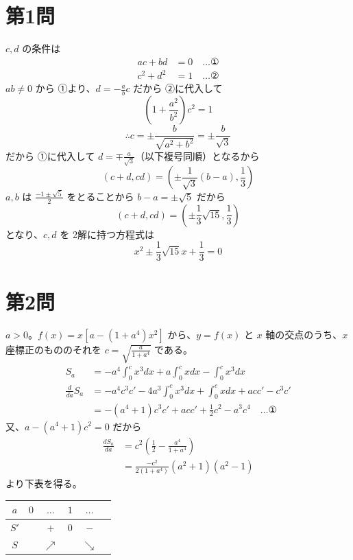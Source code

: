 \documentclass[../main.tex]{subfiles}
\begin{document}
\section*{第1問}

\noindent
[\textbf{解}] $c, d$ の条件は
\begin{align}
  ac + bd &= 0 \quad \dots \text{①} \\
  c^2 + d^2 &= 1 \quad \dots \text{②}
\end{align}
$ab \neq 0$ から ①より、$d = -\frac{a}{b}c$ だから ②に代入して
\[
  \left( 1 + \frac{a^2}{b^2} \right) c^2 = 1
\]
\[
  \therefore c = \pm \frac{b}{\sqrt{a^2+b^2}} = \pm \frac{b}{\sqrt{3}}
\]
だから ①に代入して $d = \mp \frac{a}{\sqrt{3}}$（以下複号同順）となるから
\[
  (c+d, cd) = \left( \pm \frac{1}{\sqrt{3}}(b-a), \frac{1}{3} \right)
\]
$a, b$ は $\frac{-1 \pm \sqrt{5}}{2}$ をとることから $b-a = \pm \sqrt{5}$ だから
\[
  (c+d, cd) = \left( \pm \frac{1}{3}\sqrt{15}, \frac{1}{3} \right)
\]
となり、$c, d$ を 2解に持つ方程式は
\[
  x^2 \pm \frac{1}{3}\sqrt{15}x + \frac{1}{3} = 0
\]

\newpage

\section*{第2問}

\noindent
[\textbf{解}] $a > 0$。$f(x) = x[a - (1+a^4)x^2]$ から、$y = f(x)$ と $x$ 軸の交点のうち、$x$ 座標正のもののそれを $c = \sqrt{\frac{a}{1+a^4}}$ である。
\begin{align*}
  S_a &= -a^4 \int_0^c x^3 dx + a \int_0^c x dx - \int_0^c x^3 dx \\
  \frac{d}{da} S_a &= -a^4 c^3 c' - 4a^3 \int_0^c x^3 dx + \int_0^c x dx + a c c' - c^3 c' \\
  &= -(a^4+1)c^3 c' + a c c' + \frac{1}{2}c^2 - a^3 c^4 \quad \dots \text{①}
\end{align*}
又、$a - (a^4+1)c^2 = 0$ だから
\begin{align*}
  \frac{dS_a}{da} &= c^2 \left( \frac{1}{2} - \frac{a^4}{1+a^4} \right) \\
  &= \frac{-c^2}{2(1+a^4)} (a^2+1)(a^2-1)
\end{align*}
より下表を得る。

\begin{center}
  \begin{tabular}{c|ccccc}
    $a$ & $0$ & $\dots$ & $1$ & $\dots$ \\ \hline
    $S'$ & & $+$ & $0$ & $-$ \\ \hline
    $S$ & & $\nearrow$ & & $\searrow$
  \end{tabular}
\end{center}
\end{document}
